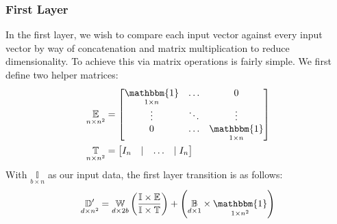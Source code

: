 \subsubsection{First Layer}
\label{subsubsec:matfirstlayer}
In the first layer, we wish to compare each input vector against every input 
vector by way of concatenation and matrix multiplication to reduce 
dimensionality. To achieve this via matrix operations is fairly simple. We first 
define two helper matrices:
\begin{align*}
	\underset{n \times n^2}{\mathbb{E}} &= \begin{bmatrix}
			\underset{1 \times n}{\mathbbm{1}} & \dots & 0\\
			\vdots & \ddots & \vdots \\
		0 & \dots & \underset{1 \times n}{\mathbbm{1}} \end{bmatrix}\\
		\underset{n \times n^2}{\mathbb{T}} &= \begin{bmatrix}
	I_n & \mid & \dots & \mid I_n \end{bmatrix}
\end{align*}
With $\underset{b \times n}{\mathbb{I}}$ as our input data, the first layer 
transition is as follows:
\begin{equation}
	\underset{d \times n^2}{\mathbb{D}^\prime} = \underset{d \times 
	2b}{\mathbb{W}}
	\left(\frac{\mathbb{I}\times\mathbb{E}}{\mathbb{I}\times\mathbb{T}}\right) + 
	\left(\underset{d \times 1}{\mathbb{B}}\times\underset{1 \times 
	n^2}{\mathbbm{1}}\right)
\end{equation}
